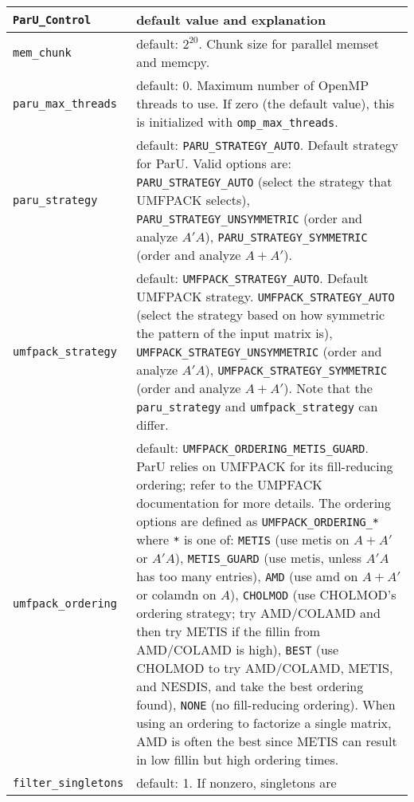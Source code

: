 \documentclass[12pt]{article}
\begin{document}
    \vspace{0.1in}
    {\footnotesize
    \begin{tabular}{|lp{4in}|}
    \hline
    \verb'ParU_Control' & default value and explanation  \\
    \hline\hline
    \verb'mem_chunk' & default: $2^{20}$. Chunk size for parallel memset and
        memcpy. \\
    \verb'paru_max_threads' & default: $0$.  Maximum number of OpenMP threads
        to use.  If zero (the default value), this is initialized with
        \verb'omp_max_threads'. \\
    \hline
    \verb'paru_strategy' & default: \verb'PARU_STRATEGY_AUTO'. Default strategy
        for ParU.  Valid options are:
        \verb'PARU_STRATEGY_AUTO' (select the strategy that UMFPACK selects),
        \verb'PARU_STRATEGY_UNSYMMETRIC' (order and analyze $A'A$),
        \verb'PARU_STRATEGY_SYMMETRIC' (order and analyze $A+A'$).
        \\
    \verb'umfpack_strategy' & default: \verb'UMFPACK_STRATEGY_AUTO'.
        Default UMFPACK strategy.
        \verb'UMFPACK_STRATEGY_AUTO' (select the strategy based on how
            symmetric the pattern of the input matrix is),
        \verb'UMFPACK_STRATEGY_UNSYMMETRIC' (order and analyze $A'A$),
        \verb'UMFPACK_STRATEGY_SYMMETRIC' (order and analyze $A+A'$).
        Note that the \verb'paru_strategy' and \verb'umfpack_strategy' can
        differ.
        \\
    \verb'umfpack_ordering' & default: \verb'UMFPACK_ORDERING_METIS_GUARD'.
        ParU relies on UMFPACK for its fill-reducing ordering;  refer to the
        UMPFACK documentation for more details.
        The ordering options are defined as \verb'UMFPACK_ORDERING_*' where
        \verb'*' is one of:
        \verb'METIS' (use metis on $A+A'$ or $A'A$),
        \verb'METIS_GUARD' (use metis, unless $A'A$ has too many entries),
        \verb'AMD' (use amd on $A+A'$ or colamdn on $A$),
        \verb'CHOLMOD' (use CHOLMOD's ordering strategy; try AMD/COLAMD and
            then try METIS if the fillin from AMD/COLAMD is high),
        \verb'BEST' (use CHOLMOD to try AMD/COLAMD, METIS, and NESDIS, and
            take the best ordering found),
        \verb'NONE' (no fill-reducing ordering).
        When using an ordering to factorize a single matrix, AMD is often
        the best since METIS can result in low fillin but high ordering times.
        \\
    \verb'filter_singletons' & default: 1. If nonzero, singletons are

\end{tabular}}
\end{document}
